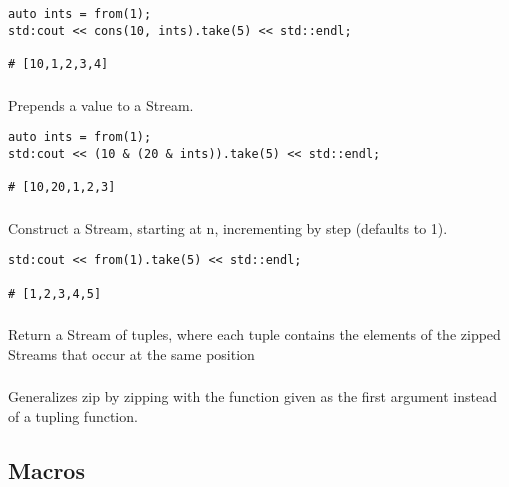 \begin{lstlisting}[title=example]
auto ints = from(1);
std:cout << cons(10, ints).take(5) << std::endl;

# [10,1,2,3,4]
\end{lstlisting}

\subsubsection{}

Prepends a value to a Stream.

\begin{lstlisting}[title=example]
auto ints = from(1);
std:cout << (10 & (20 & ints)).take(5) << std::endl;

# [10,20,1,2,3]
\end{lstlisting}

\subsubsection{}

Construct a Stream, starting at n, incrementing by step (defaults to 1).

\begin{lstlisting}[title=example]
std:cout << from(1).take(5) << std::endl;

# [1,2,3,4,5]
\end{lstlisting}

\subsubsection{}

Return a Stream of tuples, where each tuple contains the elements of the zipped Streams that occur at the same position

\subsubsection{}

Generalizes zip by zipping with the function given as the first argument instead of a tupling function.

\subsection{Macros}

